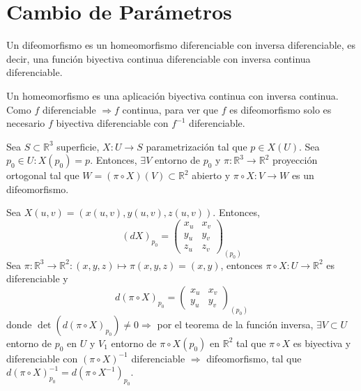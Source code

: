 \section{Cambio de Parámetros}

\begin{defn}[Difeomorfismo]
  Un difeomorfismo es un homeomorfismo diferenciable con inversa diferenciable, es decir, una función biyectiva continua diferenciable con inversa continua diferenciable.
\end{defn}

\begin{obs}
  Un homeomorfismo es una aplicación biyectiva continua con inversa continua. Como $f$ diferenciable $\Rightarrow f$ continua, para ver que $f$ es difeomorfismo solo es necesario $f$ biyectiva diferenciable con $f^{-1}$ diferenciable.
\end{obs}

\begin{prop}[]
  Sea $S \subset \mathbb{R}^{3}$ superficie, $X: U \to S$ parametrización tal que $p \in X(U)$. Sea $p_{0} \in U: X(p_{0}) = p$. Entonces, $\exists V$ entorno de $p_{0}$ y $\pi: \mathbb{R}^{3} \to \mathbb{R}^{2}$ proyección ortogonal tal que $W = (\pi \circ X)(V) \subset \mathbb{R}^{2}$ abierto y $\pi \circ X: V \to W$ es un difeomorfismo.
\end{prop}

\begin{dem}
  Sea $X(u, v) = (x(u, v), y(u, v), z(u, v))$. Entonces, 
  \[ 
    (d X)_{p_{0}} = 
    \begin{pmatrix}
       x_{u} & x_{v} \\
       y_{u} & y_{v} \\
       z_{u} & z_{v} 
     \end{pmatrix}_{(p_{0})}
  \] 
  Sea $\pi : \mathbb{R}^{3} \to \mathbb{R}^{2} : (x, y, z) \mapsto \pi(x, y, z) = (x, y)$, entonces $\pi \circ X : U \to \mathbb{R}^{2}$ es diferenciable y
  \[ 
    d(\pi \circ X)_{p_{0}} = 
    \begin{pmatrix}
       x_{u} & x_{v} \\
       y_{u} & y_{v}
     \end{pmatrix}_{(p_{0})}
  \] 
  donde $\det(d(\pi \circ X)_{p_{0}}) \neq 0 \Rightarrow$ por el teorema de la función inversa, $\exists V \subset U$ entorno de $p_{0}$ en $U$ y $V_{1}$ entorno de $\pi \circ X (p_{0})$ en $\mathbb{R}^{2}$ tal que $\pi \circ X$ es biyectiva y diferenciable con $(\pi \circ X)^{-1}$ diferenciable $\Rightarrow$ difeomorfismo, tal que $d(\pi \circ X)_{p_{0}}^{-1} = d(\pi \circ X ^{-1})_{p_{0}}$.
\end{dem}

